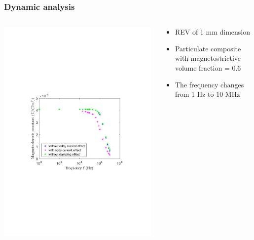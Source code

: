 \documentclass[compress]{beamer}
\begin{document}
\begin{frame}\frametitle{Dynamic analysis}
\begin{columns}[totalwidth=\textwidth]
	\begin{column}{.75\textwidth}
\includegraphics[width=0.99\textwidth]{Graphic/04_cubeeddyeffect.pdf}
\end{column}
\begin{column}{.25\textwidth}
\begin{itemize}[label=$\bullet$, font=\small, leftmargin=*]
	\item REV of 1 mm dimension
	\item Particulate composite with magnetostrictive volume fraction = 0.6
	\item The frequency changes from  1 Hz to 10 MHz 
	\end{itemize}
\end{column}
\end{columns}
\end{frame}
\end{document}
